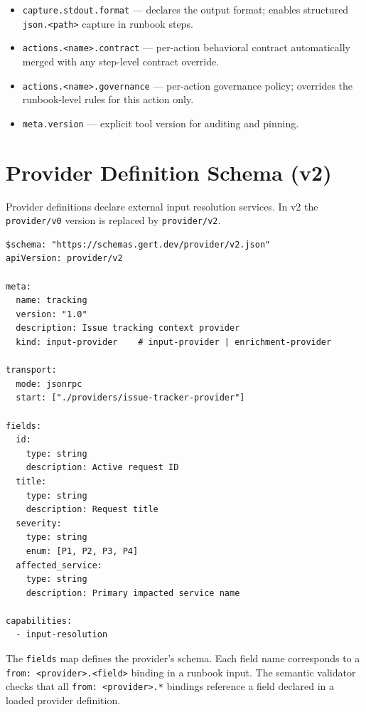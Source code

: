 \begin{itemize}
  \item \texttt{capture.stdout.format} — declares the output format; enables
        structured \texttt{json.<path>} capture in runbook steps.
  \item \texttt{actions.<name>.contract} — per-action behavioral contract
        automatically merged with any step-level contract override.
  \item \texttt{actions.<name>.governance} — per-action governance policy;
        overrides the runbook-level rules for this action only.
  \item \texttt{meta.version} — explicit tool version for auditing and pinning.
\end{itemize}

\section{Provider Definition Schema (v2)}
\label{sec:provider-schema}

Provider definitions declare external input resolution services.
In v2 the \texttt{provider/v0} version is replaced by \texttt{provider/v2}.

\begin{verbatim}
$schema: "https://schemas.gert.dev/provider/v2.json"
apiVersion: provider/v2

meta:
  name: tracking
  version: "1.0"
  description: Issue tracking context provider
  kind: input-provider    # input-provider | enrichment-provider

transport:
  mode: jsonrpc
  start: ["./providers/issue-tracker-provider"]

fields:
  id:
    type: string
    description: Active request ID
  title:
    type: string
    description: Request title
  severity:
    type: string
    enum: [P1, P2, P3, P4]
  affected_service:
    type: string
    description: Primary impacted service name

capabilities:
  - input-resolution
\end{verbatim}

The \texttt{fields} map defines the provider's schema.  Each field name
corresponds to a \texttt{from: <provider>.<field>} binding in a runbook input.
The semantic validator checks that all \texttt{from: <provider>.*} bindings
reference a field declared in a loaded provider definition.

